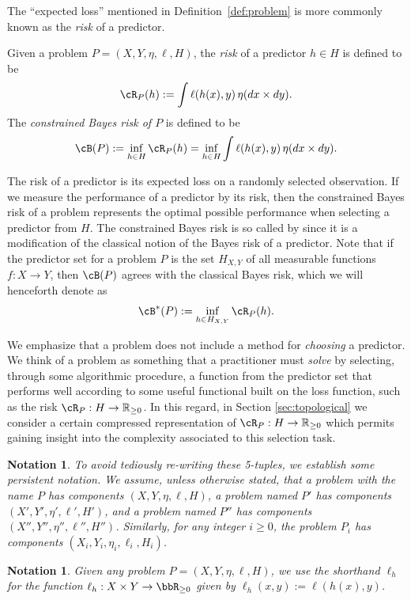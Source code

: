 \documentclass[twoside,11pt]{article}
\newtheorem{notation}[theorem]{Notation}
\begin{document}
The ``expected loss'' mentioned in Definition~\ref{def:problem} is more commonly known as the \emph{risk} of a predictor.

\begin{definition}
    Given a problem $P = (X,Y,\eta,\ell, H)$, the \emph{risk} of a predictor $h\in H$ is defined to be
    \[\cR_P(h) := \int \ell(h(x),y)\, \eta(dx\times dy).\]
    The \emph{constrained Bayes risk of $P$} is defined to be
    \[\cB(P) := \inf_{h\in H} \cR_P(h) = \inf_{h\in H} \int \ell(h(x),y)\, \eta(dx\times dy).\]
\end{definition}
The risk of a predictor is its expected loss on a randomly selected observation. If we measure the performance of a predictor by its risk, then the constrained Bayes risk of a problem represents the optimal possible performance when selecting a predictor from $H$. The constrained Bayes risk is so called by \citet{williamson_information_2024} since it is a modification of the classical notion of the Bayes risk of a predictor. Note that if the predictor set for a problem $P$ is the set $H_{X,Y}$ of all measurable functions $f:X\to Y$, then $\cB(P)$ agrees with the classical Bayes risk, which we will henceforth denote as 
\[\cB^*(P) := \inf_{h\in H_{X,Y}} \cR_P(h).\]



We emphasize that a problem does not include a method for \emph{choosing} a predictor. We think of a problem as something that a practitioner must \emph{solve} by selecting, through some algorithmic procedure, a function from the predictor set that performs well according to some useful functional built on the loss function, such as the risk $\cR_P:H\to \mathbb{R}_{\geq 0}$. In this regard, in Section \ref{sec:topological} we consider a certain compressed representation of $\cR_P:H\to \mathbb{R}_{\geq 0}$ which permits gaining insight into the complexity associated to this selection task.



\begin{notation}
To avoid tediously re-writing these 5-tuples, we establish some persistent notation. We assume, unless otherwise stated, that a problem with the name $P$ has components $(X,Y,\eta,\ell,H)$, a problem named $P'$ has components $(X',Y',\eta',\ell',H')$, and a problem named $P''$ has components $(X'',Y'',\eta'',\ell'',H'')$. Similarly, for any integer $i\geq 0$, the problem $P_i$ has components $(X_i,Y_i,\eta_i,\ell_i,H_i)$.
\end{notation}
\begin{notation}
    Given any problem $P = (X,Y,\eta,\ell,H)$, we use the shorthand $\ell_h$ for the function $\ell_h:X\times Y \to \bbR_{\geq 0}$ given by $\ell_h(x,y):= \ell(h(x),y)$.
\end{notation}
\end{document}
